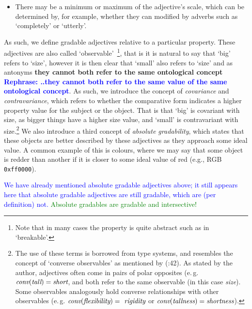 \documentclass[11pt]{article}
\begin{document}
\begin{itemize}[noitemsep]
\item There may be a minimum or maximum of the adjective's scale, which can be determined
by, for example, whether they can modified by adverbs such as `completely' or `utterly'.
\end{itemize}

As such, we define gradable adjectives relative to a particular 
property. These adjectives are also called `observable'~\cite{Bennett06kr}\footnote{Note that in many cases the property is quite abstract such as in 
`breakable'.}, that is it is natural to say that `big' refers to 
`size', however it is then clear that `small' also refers to `size' and as antonyms 
\textbf{they cannot both refer to the same ontological concept \textcolor{blue}{Rephrase: ..they cannot both refer to the same value of the same ontological concept}}. As such, we introduce 
the concept of \emph{covariance} and \emph{contravariance}, which refers to 
whether the comparative form indicates a higher property value for the subject 
or the object. That is that `big' is covariant with size, as bigger things have 
a higher size value, and `small' is contravariant with size.\footnote{
    The use of these terms is borrowed from type systems, and resembles the concept of `converse observables' as mentioned by (\cite{Bennett06kr}:42). As stated by the author, adjectives often come in pairs of polar opposites (e.\,g. $\text{\em conv}(\text{\em tall})=\text{\em short}$, and both refer to the same observable (in this case \textit{size}). Some observables analogously hold converse relationships with other observables (e.\,g. $\text{\em conv}(\text{\em flexibility})=\text{\em rigidity}$ or $\text{\em conv}(\text{\em tallness})=\text{\em shortness}$).} 
    We also introduce 
a third concept of \emph{absolute gradability}, which states that these objects 
are better described by these adjectives as they approach some ideal value. 
A common example of this is colours, where we may say that some object is 
redder than another if it is closer to some ideal value of red 
(e.g., RGB {\tt 0xff0000}).

\textcolor{blue}{We have already mentioned absolute gradable adjectives above; it still appears here that absolute gradable adjectives are still gradable, which are (per definition) not.}
\textcolor{green}{Absolute gradables are gradable and intersective!}
\end{document}
